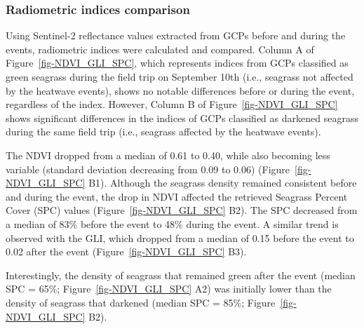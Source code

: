 \documentclass[
  number]{elsarticle}
\begin{document}
\subsubsection{Radiometric indices
comparison}\label{radiometric-indices-comparison}

Using Sentinel-2 reflectance values extracted from GCPs before and
during the events, radiometric indices were calculated and compared.
Column A of Figure~\ref{fig-NDVI_GLI_SPC}, which represents indices from
GCPs classified as green seagrass during the field trip on September
10th (i.e., seagrass not affected by the heatwave events), shows no
notable differences before or during the event, regardless of the index.
However, Column B of Figure~\ref{fig-NDVI_GLI_SPC} shows significant
differences in the indices of GCPs classified as darkened seagrass
during the same field trip (i.e., seagrass affected by the heatwave
events).

The NDVI dropped from a median of 0.61 to 0.40, while also becoming less
variable (standard deviation decreasing from 0.09 to 0.06)
(Figure~\ref{fig-NDVI_GLI_SPC} B1). Although the seagrass density
remained consistent before and during the event, the drop in NDVI
affected the retrieved Seagrass Percent Cover (SPC) values
(Figure~\ref{fig-NDVI_GLI_SPC} B2). The SPC decreased from a median of
83\% before the event to 48\% during the event. A similar trend is
observed with the GLI, which dropped from a median of 0.15 before the
event to 0.02 after the event (Figure~\ref{fig-NDVI_GLI_SPC} B3).

Interestingly, the density of seagrass that remained green after the
event (median SPC = 65\%; Figure~\ref{fig-NDVI_GLI_SPC} A2) was
initially lower than the density of seagrass that darkened (median SPC =
85\%; Figure~\ref{fig-NDVI_GLI_SPC} B2).
\end{document}
